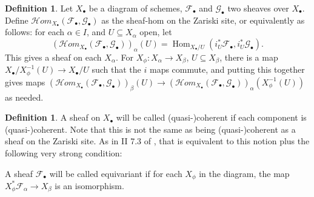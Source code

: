 \documentclass[proquest]{uwthesis}[2014/11/13]
\theoremstyle{definition}
\newtheorem{definition}[theorem]{Definition}
\DeclareMathOperator{\Hom}{Hom}
\newcommand{\cHom}{\mathcal{H} \textit{om}}
\newcommand{\FF}{\mathscr{F}}
\newcommand{\GG}{\mathscr{G}}
\begin{document}
\begin{definition}
	Let $X_\bullet$ be a diagram of schemes, $\FF_\bullet$ and $\GG_\bullet$ two sheaves over $X_\bullet$.
	Define $\cHom_{X_\bullet}(\FF_\bullet, \GG_\bullet)$ as the sheaf-hom on the Zariski site, or equivalently as follows: for each $\alpha \in I$, and $U \subseteq X_\alpha$ open, let
	\[
		(\cHom_{X_\bullet}(\FF_\bullet, \GG_\bullet))_\alpha(U) = \Hom_{X_\bullet/U} ( i_U^* \FF_\bullet , i_U^* \GG_\bullet).
	\]
	This gives a sheaf on each $X_\alpha$.
	For $X_\phi : X_\alpha \rightarrow X_\beta$, $U \subseteq X_\beta$, there is a map $X_\bullet / X_\phi^{-1}(U) \rightarrow X_\bullet / U$ such that the $i$ maps commute, and putting this together gives maps $(\cHom_{X_\bullet}(\FF_\bullet, \GG_\bullet))_\beta(U) \rightarrow (\cHom_{X_\bullet}(\FF_\bullet, \GG_\bullet))_\alpha(X_\phi^{-1}(U))$ as needed.
\end{definition}

\begin{definition}
	A sheaf on $X_\bullet$ will be called (quasi-)coherent if each component is (quasi-)coherent.
	Note that this is not the same as being (quasi-)coherent as a sheaf on the Zariski site.
	As in II 7.3 of \cite{Lipman2009}, that is equivalent to this notion plus the following very strong condition:
	
	A sheaf $\FF_\bullet$ will be called equivariant if for each $X_\phi$ in the diagram, the map $X_\phi^* \FF_\alpha \rightarrow X_\beta$ is an isomorphism.
\end{definition}
\end{document}
